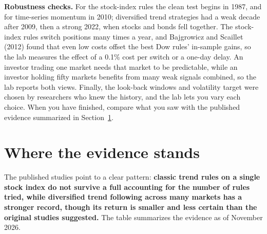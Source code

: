 \label{sec:08-stress}
\textbf{Robustness checks.} For the stock-index rules the clean test begins in 1987, and for time-series momentum in 2010; diversified trend strategies had a weak decade after 2009, then a strong 2022, when stocks and bonds fell together. The stock-index rules switch positions many times a year, and Bajgrowicz and Scaillet (2012) found that even low costs offset the best Dow rules' in-sample gains, so the lab measures the effect of a 0.1\% cost per switch or a one-day delay. An investor trading one market needs that market to be predictable, while an investor holding fifty markets benefits from many weak signals combined, so the lab reports both views. Finally, the look-back windows and volatility target were chosen by researchers who knew the history, and the lab lets you vary each choice. When you have finished, compare what you saw with the published evidence summarized in Section~\ref{sec:08-verdict}.

\section{Where the evidence stands}
\label{sec:08-verdict}

The published studies point to a clear pattern: \textbf{classic trend rules on a single stock index do not survive a full accounting for the number of rules tried, while diversified trend following across many markets has a stronger record, though its return is smaller and less certain than the original studies suggested.} The table summarizes the evidence as of November 2026.

